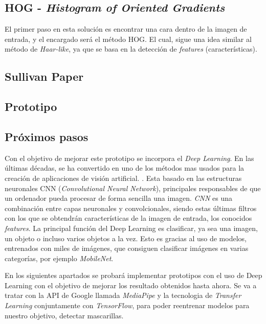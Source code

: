 \subsection*{HOG - \textit{Histogram of Oriented Gradients}}

El primer paso en esta solución es encontrar una cara dentro de la imagen de entrada, y el encargado será el método HOG. El cual, sigue una idea similar al método de \textit{Haar-like}, ya que se basa en la detección de \textit{features} (características).

\subsection*{Sullivan Paper}

\subsection*{Prototipo}

\subsection*{Próximos pasos}

Con el objetivo de mejorar este prototipo se incorpora el \textit{Deep Learning}. En las últimas décadas, se ha convertido en uno de los métodos mas usados para la creación de aplicaciones de visión artificial. \cite{szeliski_2018}. Esta basado en las estructuras neuronales CNN (\textit{Convolutional Neural Network}), principales responsables de que un ordenador pueda procesar de forma sencilla una imagen. \textit{CNN} es una combinación entre capas neuronales y convolcionales, siendo estas últimas filtros con los que se obtendrán características de la imagen de entrada, los conocidos \textit{features}. La principal función del Deep Learning es clasificar, ya sea una imagen, un objeto o incluso varios objetos a la vez. Esto es gracias al uso de modelos, entrenados con miles de imágenes, que consiguen clasificar imágenes en varias categorías, por ejemplo \textit{MobileNet}. \cite{cnn}

En los siguientes apartados se probará implementar prototipos con el uso de Deep Learning con el objetivo de mejorar los resultado obtenidos hasta ahora. Se va a tratar con la API de Google llamada \textit{MediaPipe} y la tecnologia de \textit{Transfer Learning} conjuntamente con \textit{TensorFlow}, para poder reentrenar modelos para nuestro objetivo, detectar mascarillas.

